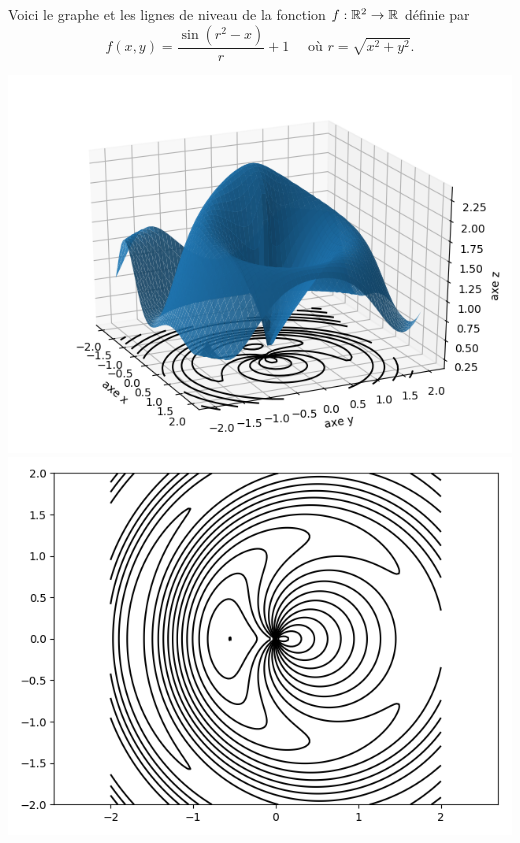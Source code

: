 \begin{exemple}{}{}
	Voici le graphe et les lignes de niveau de la fonction $f : \mathbb{R}^2 \to \mathbb{R}$ définie par
	$$f(x,y) = \frac{\sin(r^2-x)}{r}+1 \quad \text{ où } r = \sqrt{x^2+y^2}.$$
	
	\begin{center}
		\includegraphics[scale=\myscale,scale=0.5]{figures/fonctions-niveau-2a}
		\includegraphics[scale=\myscale,scale=0.5]{figures/fonctions-niveau-2b}
	\end{center}
	
	
\end{exemple} 


